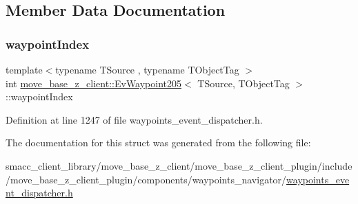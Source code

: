 \subsection{Member Data Documentation}
\mbox{\label{structmove__base__z__client_1_1EvWaypoint205_a443fa6ae021da1ed35eb875127d561e5}} 
\subsubsection{\texorpdfstring{waypoint\+Index}{waypointIndex}}
{\footnotesize\ttfamily template$<$typename T\+Source , typename T\+Object\+Tag $>$ \\
int \hyperlink{structmove__base__z__client_1_1EvWaypoint205}{move\+\_\+base\+\_\+z\+\_\+client\+::\+Ev\+Waypoint205}$<$ T\+Source, T\+Object\+Tag $>$\+::waypoint\+Index}



Definition at line 1247 of file waypoints\+\_\+event\+\_\+dispatcher.\+h.



The documentation for this struct was generated from the following file\+:\begin{DoxyCompactItemize}
\item 
smacc\+\_\+client\+\_\+library/move\+\_\+base\+\_\+z\+\_\+client/move\+\_\+base\+\_\+z\+\_\+client\+\_\+plugin/include/move\+\_\+base\+\_\+z\+\_\+client\+\_\+plugin/components/waypoints\+\_\+navigator/\hyperlink{waypoints__event__dispatcher_8h}{waypoints\+\_\+event\+\_\+dispatcher.\+h}\end{DoxyCompactItemize}

